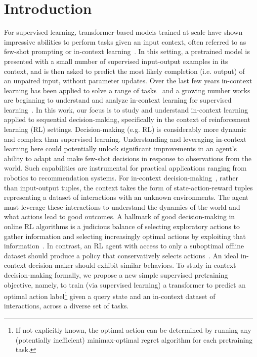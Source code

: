 \documentclass{article}
\begin{document}
\section{Introduction}
For supervised learning, transformer-based models trained at scale have shown impressive abilities to perform tasks given an input context, often referred to as few-shot prompting or in-context learning~\citep{brown2020language}. In this setting, a pretrained model is presented with a small number of supervised input-output examples in its context, and is then asked to predict the most likely completion (i.e. output) of an unpaired input, without parameter updates. Over the last few years in-context learning has been applied to solve a range of tasks~\citep{min2022rethinking} and a growing number works are beginning to understand and analyze in-context learning for supervised learning~\citep{chan2022data,garg2022can,razeghi2022impact,akyurek2022learning}.
In this work, our focus is to study and understand in-context learning applied to sequential decision-making, specifically in the context of reinforcement learning (RL) settings. Decision-making (e.g. RL) is considerably more dynamic and complex than supervised learning. Understanding and leveraging in-context learning here could potentially unlock significant improvements in an agent's ability to adapt and make few-shot decisions in response to observations from the world. Such capabilities are instrumental for practical applications ranging from robotics to recommendation systems.
For in-context decision-making~\citep{laskin2022context,xu2022prompting,xu2023hyper}, rather than input-output tuples, the context takes the form of state-action-reward tuples representing a dataset of interactions with an unknown environments. The agent must leverage these interactions to understand the dynamics of the world and what actions lead to good outcomes. A hallmark of good decision-making in online RL algorithms is a judicious balance of selecting exploratory actions to gather information and selecting increasingly optimal actions by exploiting that information~\citep{sutton2018reinforcement}. In contrast, an RL agent with access to only a suboptimal offline dataset should produce a policy that conservatively selects actions~\citep{levine2020offline}. An ideal in-context decision-maker should exhibit similar behaviors.
To study in-context decision-making formally, we propose a new simple supervised pretraining objective, namely, to train (via supervised learning) a transformer to predict an optimal action label\footnote{If not explicitly known, the optimal action can be determined by running any (potentially inefficient) minimax-optimal regret algorithm for each pretraining task.} given a query state and an in-context dataset of interactions, across a diverse set of tasks.
\end{document}
